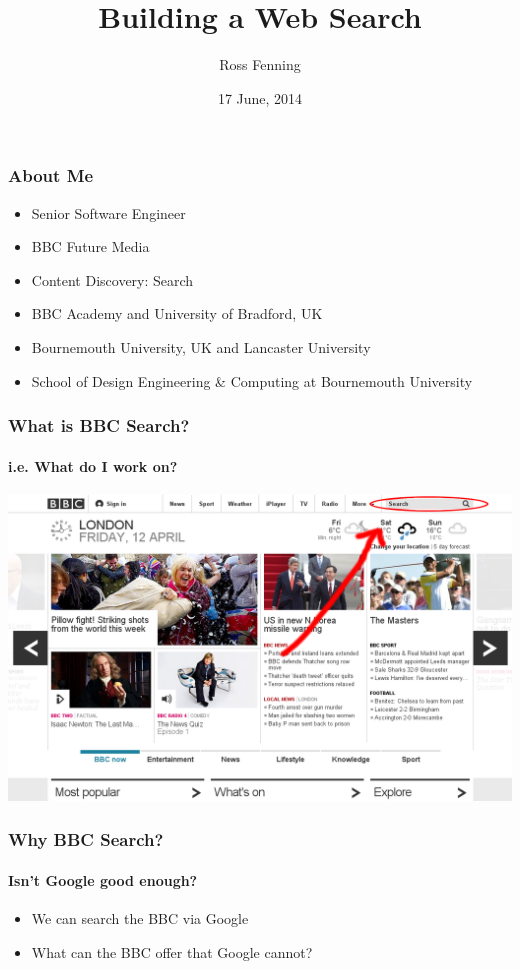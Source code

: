 \documentclass{beamer}
\title{Building a Web Search}
\author{Ross Fenning}
\institute{
  Senior Software Engineer
  \\Content Discovery
  \\Future Media
  \\BBC
}
\date{17 June, 2014}
\begin{document}
\begin{frame}[plain]
  \titlepage
\end{frame}

\begin{frame}
  \frametitle{About Me}
  \begin{itemize}
    \pause \item Senior Software Engineer
    \pause \item BBC Future Media
    \pause \item Content Discovery: Search
    \pause \item BBC Academy and University of Bradford, UK
    \pause \item Bournemouth University, UK and Lancaster University
    \pause \item School of Design Engineering \& Computing at Bournemouth University
  \end{itemize}
\end{frame}

\begin{frame}
  \frametitle{What is BBC Search?}
  \framesubtitle{i.e. What do I work on?}
  \includegraphics[width=\linewidth]{homepage.png}
\end{frame}

\begin{frame}
  \frametitle{Why BBC Search?}
  \framesubtitle{Isn't Google good enough?}
  \begin{itemize}
    \pause \item We can search the BBC via Google
    \pause \item What can the BBC offer that Google cannot?
  \end{itemize}
\end{frame}

\end{document}
